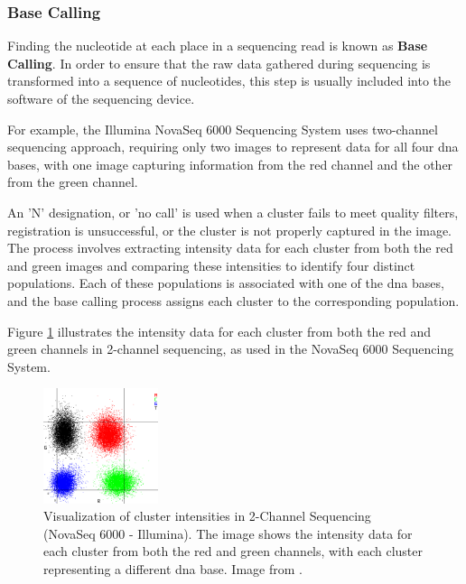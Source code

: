 \subsubsection{\textbf{Base Calling}} \label{subsubsec:ngs_basecalling}

Finding the nucleotide at each place in a sequencing read is known as \textbf{Base Calling}. In order to ensure that the raw data gathered during sequencing is transformed into a sequence of nucleotides, this step is usually included into the software of the sequencing device. \cite{Rehm2013} 

For example, the Illumina NovaSeq 6000 Sequencing System uses two-channel sequencing approach, requiring only two images to represent data for all four \ac{dna} bases, with one image capturing information from the red channel and the other from the green channel. \cite{NovaSeq}

An 'N' designation, or 'no call' is used when a cluster fails to meet quality filters, registration is unsuccessful, or the cluster is not properly captured in the image. The process involves extracting intensity data for each cluster from both the red and green images and comparing these intensities to identify four distinct populations. Each of these populations is associated with one of the \ac{dna} bases, and the base calling process assigns each cluster to the corresponding population. \cite{NovaSeq}

Figure \ref{fig:cluster} illustrates the intensity data for each cluster from both the red and green channels in 2-channel sequencing, as used in the NovaSeq 6000 Sequencing System.

\begin{figure}[H]
    \centering
    \includegraphics[width=0.3\textwidth]{figs/ClusterIntensities.png}
    \caption{Visualization of cluster intensities in 2-Channel Sequencing (NovaSeq 6000 - Illumina). The image shows the intensity data for each cluster from both the red and green channels, with each cluster representing a different \ac{dna} base. Image from \cite{NovaSeq}.} 
    \label{fig:cluster}
\end{figure}

